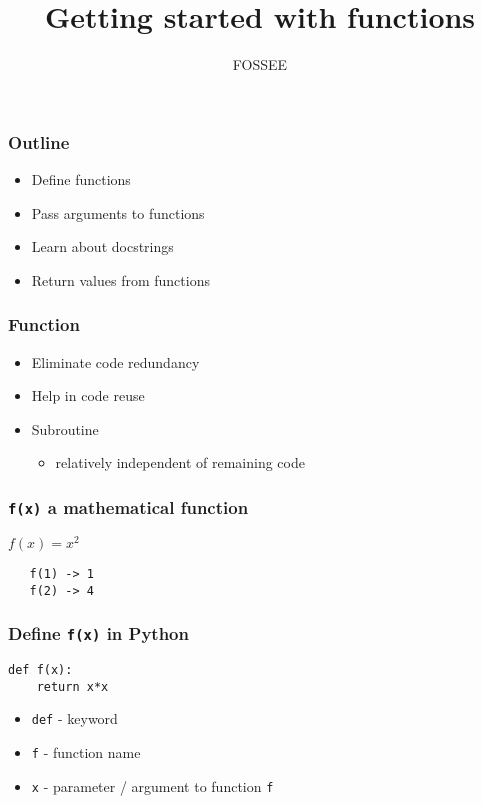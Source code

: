 \documentclass[presentation]{beamer}
\title{Getting started with functions}
\author{FOSSEE}
\date{}
\begin{document}
\maketitle









\begin{frame}
\frametitle{Outline}
\label{sec-1}

\begin{itemize}
\item Define functions
\item Pass arguments to functions
\item Learn about docstrings
\item Return values from functions
\end{itemize}
\end{frame}
\begin{frame}
\frametitle{Function}
\label{sec-2}

\begin{itemize}
\item Eliminate code redundancy
\item Help in code reuse
\item Subroutine

\begin{itemize}
\item relatively independent of remaining code
\end{itemize}

\end{itemize}
\end{frame}
\begin{frame}[fragile]
\frametitle{\texttt{f(x)} a mathematical function}
\label{sec-3}


  $f(x) = x^{2}$

\begin{verbatim}
   f(1) -> 1
   f(2) -> 4
\end{verbatim}
\end{frame}
\begin{frame}[fragile]
\frametitle{Define \texttt{f(x)} in Python}
\label{sec-4}

\begin{verbatim}
def f(x):
    return x*x
\end{verbatim}

\begin{itemize}
\item \texttt{def} - keyword
\item \texttt{f} - function name
\item \texttt{x} - parameter / argument to function \texttt{f}
\end{itemize}
\end{frame}
\end{document}
